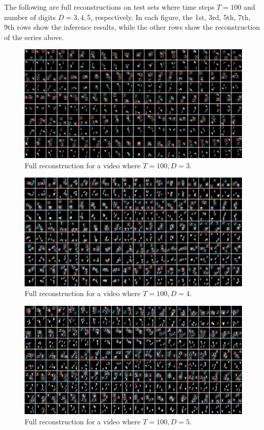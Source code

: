\documentclass[anonymous=false, %
               format=acmsmall, %
               review=true, %
               screen=true, %
               nonacm=true]{acmart}
\theoremstyle{definition}
\begin{document}
The following are full reconstructions on test sets where time steps $T=100$ and number of digits $D=3, 4, 5$, respectively. In each figure, the 1st, 3rd, 5th, 7th, 9th rows show the inference results, while the other rows show the reconstruction of the series above.
\begin{figure}[h!]
\includegraphics[width=\linewidth]{figures/T=100-D=3.pdf}
\caption{Full reconstruction for a video where $T=100, D=3$.}
\end{figure}
\newpage
\begin{figure}[h!]
\includegraphics[width=\linewidth]{figures/T=100-D=4.pdf}
\caption{Full reconstruction for a video where $T=100, D=4$.}
\end{figure}

\begin{figure}[h!]
\includegraphics[width=\linewidth]{figures/T=100-D=5.pdf}
\caption{Full reconstruction for a video where $T=100, D=5$.}
\end{figure}
\end{document}
